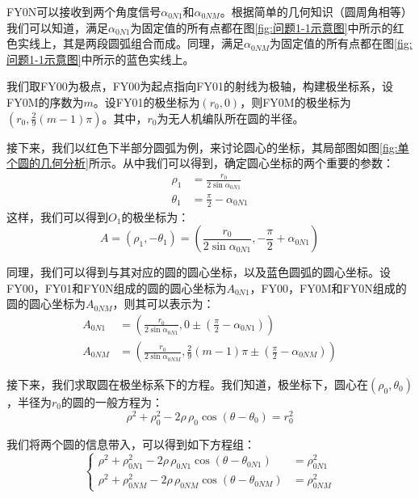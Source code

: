\documentclass[12pt,AutoFakeSlant,AutoFakeBold]{article}
\begin{document}
FY0N可以接收到两个角度信号$\alpha_{0N1}$和$\alpha_{0NM}$。根据简单的几何知识（圆周角相等）我们可以知道，满足$\alpha_{0N1}$为固定值的所有点都在图\ref{fig:问题1-1示意图}中所示的红色实线上，其是两段圆弧组合而成。同理，满足$\alpha_{0NM}$为固定值的所有点都在图\ref{fig:问题1-1示意图}中所示的蓝色实线上。

我们取FY00为极点，FY00为起点指向FY01的射线为极轴，构建极坐标系，设FY0M的序数为$m$。设FY01的极坐标为$\left(r_0,0\right)$，则FY0M的极坐标为$\left(r_0,\frac{2}{9}\left(m-1\right)\pi\right)$。其中，$r_0$为无人机编队所在圆的半径。

接下来，我们以红色下半部分圆弧为例，来讨论圆心的坐标，其局部图如图\ref{fig:单个圆的几何分析}所示。从中我们可以得到，确定圆心坐标的两个重要的参数：
\begin{align}
    \rho_1 &= \frac{r_0}{2\sin \alpha_{0N1}}\\
    \theta_1 &= \frac{\pi}{2} - \alpha_{0N1}
\end{align}
这样，我们可以得到$O_1$的极坐标为：
\begin{equation}
    A = \left(\rho_1,-\theta_1\right) = \left(\frac{r_0}{2\sin \alpha_{0N1}}, - \frac{\pi}{2} + \alpha_{0N1}\right)
\end{equation}

同理，我们可以得到与其对应的圆的圆心坐标，以及蓝色圆弧的圆心坐标。设FY00，FY01和FY0N组成的圆的圆心坐标为$A_{0N1}$，FY00，FY0M和FY0N组成的圆的圆心坐标为$A_{0NM}$，则其可以表示为：
\begin{align}
    A_{0N1} &= \left(\frac{r_0}{2\sin \alpha_{0N1}}, 0 \pm \left(\frac{\pi}{2} - \alpha_{0N1}\right)\right)\\
    A_{0NM} &= \left(\frac{r_0}{2\sin \alpha_{0NM}}, \frac{2}{9}\left(m-1\right)\pi \pm \left(\frac{\pi}{2} - \alpha_{0NM}\right)\right)\label{eq:0NM圆心坐标}
\end{align}

接下来，我们求取圆在极坐标系下的方程。我们知道，极坐标下，圆心在$(\rho_0,\theta_0)$，半径为$r_0$的圆的一般方程为：
\begin{equation}
    \rho^2 + \rho_0^2 - 2\rho\,\rho_0\cos\left(\theta - \theta_0\right) = r_0^2
\end{equation}

我们将两个圆的信息带入，可以得到如下方程组：
\begin{equation}
    \left\{
    \begin{aligned}
        \rho^2 + \rho_{0N1}^2 - 2\rho\,\rho_{0N1}\cos\left(\theta - \theta_{0N1}\right) &= \rho_{0N1}^2\\
        \rho^2 + \rho_{0NM}^2 - 2\rho\,\rho_{0NM}\cos\left(\theta - \theta_{0NM}\right) &= \rho_{0NM}^2
    \end{aligned}
    \right.
\end{equation}
\end{document}
